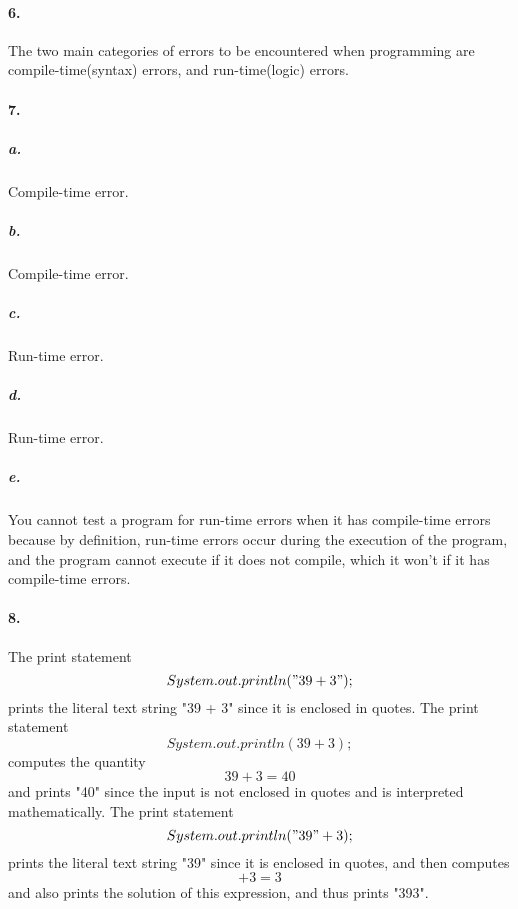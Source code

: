 \documentclass[10pt]{article}
\begin{document}
\paragraph{6. }
The two main categories of errors to be encountered when programming are compile-time(syntax) errors, and run-time(logic) errors. 
\paragraph{7. }
\subparagraph{a. }
Compile-time error. 
\subparagraph{b. }
Compile-time error. 
\subparagraph{c. }
Run-time error. 
\subparagraph{d. }
Run-time error. 
\subparagraph{e. }
You cannot test a program for run-time errors when it has compile-time errors because by definition, run-time errors occur during the execution of the program, and the program cannot execute if it does not compile, which it won't if it has compile-time errors. 
\paragraph{8. }
The print statement \[System.out.println("39 + 3");\] prints the literal text string "39 + 3" since it is enclosed in quotes. The print statement \[System.out.println(39 + 3);\] computes the quantity \[39 + 3 = 40\] and prints "40" since the input is not enclosed in quotes and is interpreted mathematically. The print statement \[System.out.println("39" + 3);\] prints the literal text string "39" since it is enclosed in quotes, and then computes \[+ 3 = 3\] and also prints the solution of this expression, and thus prints "393". 
\end{document}
